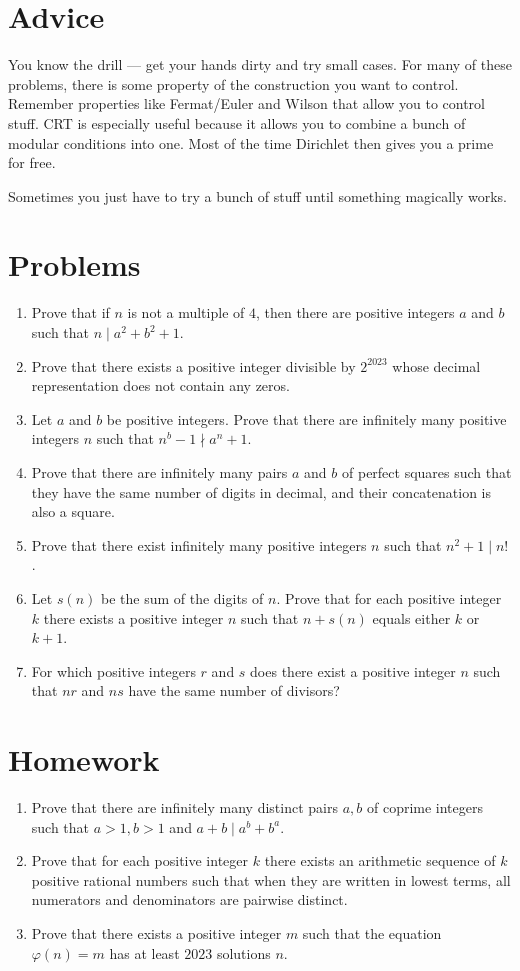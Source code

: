 \documentclass{article}
\begin{document}
\section{Advice}
You know the drill --- get your hands dirty and try small cases. For many of
these problems, there is some property of the construction you want to control.
Remember properties like Fermat/Euler and Wilson that allow you to control stuff.
CRT is especially useful because it allows
you to combine a bunch of modular conditions into one. Most of the time
Dirichlet then gives you a prime for free.

Sometimes you just have to try a bunch of stuff until something magically works.
\section{Problems}
\begin{enumerate}
  \item Prove that if $n$ is not a multiple of $4$, then there are positive
    integers $a$ and $b$ such that $n\mid a^2+b^2+1$.
  \item Prove that there exists a positive integer divisible by $2^{2023}$ whose
    decimal representation does not contain any zeros.
  \item Let $a$ and $b$ be positive integers. Prove that there are infinitely
    many positive integers $n$ such that $n^b-1\nmid a^n+1$.
  \item Prove that there are infinitely many pairs $a$ and $b$ of perfect
    squares such that they have the same number of digits in decimal, and their
    concatenation is also a square.
  \item Prove that there exist infinitely many positive integers $n$ such that
    $n^2+1\mid n!$.
  \item Let $s(n)$ be the sum of the digits of $n$. Prove that for each positive
    integer $k$ there exists a positive integer $n$ such that $n+s(n)$ equals
    either $k$ or $k+1$.
  \item For which positive integers $r$ and $s$ does there exist a positive
    integer $n$ such that $nr$ and $ns$ have the same number of divisors?
\end{enumerate}
\newpage
\section{Homework}
\begin{enumerate}
  \item Prove that there are infinitely many distinct pairs $a,b$ of coprime
    integers such that $a>1,b>1$ and $a+b\mid a^b+b^a$.
  \item Prove that for each positive integer $k$ there exists an arithmetic
    sequence of $k$ positive rational numbers such that when they are written in lowest
    terms, all numerators and denominators are pairwise distinct.
  \item Prove that there exists a positive integer $m$ such that the equation
    $\varphi(n)=m$ has at least $2023$ solutions $n$.
\end{enumerate}
\end{document}
